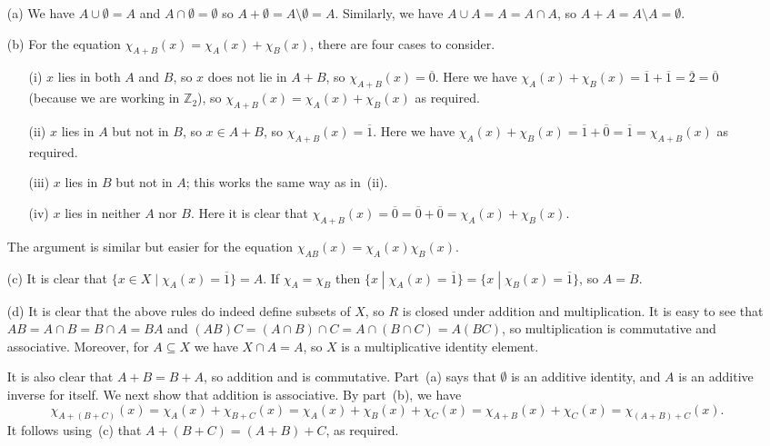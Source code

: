 \documentclass{amsart}
\newcommand{\Z}         {{\mathbb{Z}}}
\newcommand{\ov}[1]     {\overline{#1}}
\newcommand{\sm}        {\setminus}
\newcommand{\sse}       {\subseteq}
\newcommand{\st}        {\;|\;}
\renewcommand{\:}{\colon}
\theoremstyle{definition}
\renewenvironment{solution}{\SolutionAtEnd}{\endSolutionAtEnd}
\begin{document}
\begin{solution}
 \begin{itemize}
  \item[(a)] We have $A\cup\emptyset=A$ and $A\cap\emptyset=\emptyset$
   so $A+\emptyset=A\sm\emptyset=A$.  Similarly, we have
   $A\cup A=A=A\cap A$, so $A+A=A\sm A=\emptyset$.
  \item[(b)] For the equation $\chi_{A+B}(x)=\chi_A(x)+\chi_B(x)$,
   there are four cases to consider.
   \begin{itemize}
   \item[(i)] $x$ lies in both $A$ and $B$, so $x$ does not lie in
    $A+B$, so $\chi_{A+B}(x)=\ov{0}$.  Here we have
    $\chi_A(x)+\chi_B(x)=\ov{1}+\ov{1}=\ov{2}=\ov{0}$ (because we are
    working in $\Z_2$), so $\chi_{A+B}(x)=\chi_A(x)+\chi_B(x)$ as
    required.
   \item[(ii)] $x$ lies in $A$ but not in $B$, so $x\in A+B$, so
    $\chi_{A+B}(x)=\ov{1}$.    Here we have
    $\chi_A(x)+\chi_B(x)=\ov{1}+\ov{0}=\ov{1}=\chi_{A+B}(x)$ as
    required. 
   \item[(iii)] $x$ lies in $B$ but not in $A$; this works the same
    way as in~(ii).
   \item[(iv)] $x$ lies in neither $A$ nor $B$.  Here it is clear that
    $\chi_{A+B}(x)=\ov{0}=\ov{0}+\ov{0}=\chi_A(x)+\chi_B(x)$.
   \end{itemize}
   The argument is similar but easier for the equation
   $\chi_{AB}(x)=\chi_A(x)\chi_B(x)$.  
  \item[(c)] It is clear that $\{x\in X\st \chi_A(x)=\ov{1}\}=A$.  If
   $\chi_A=\chi_B$ then
   $\{x\st\chi_A(x)=\ov{1}\}=\{x\st\chi_B(x)=\ov{1}\}$, so $A=B$.
  \item[(d)]
   It is clear that the above rules do indeed define subsets of $X$, so
   $R$ is closed under addition and multiplication.  It is easy to see
   that $AB=A\cap B=B\cap A=BA$ and
   $(AB)C=(A\cap B)\cap C=A\cap(B\cap C)=A(BC)$, so multiplication is
   commutative and associative.  Moreover, for $A\sse X$ we have
   $X\cap A=A$, so $X$ is a multiplicative identity element.

   It is also clear that $A+B=B+A$, so addition and is commutative.
   Part~(a) says that $\emptyset$ is an additive identity, and $A$ is
   an additive inverse for itself.  We next show that addition is
   associative.  By part~(b), we have
   \[ \chi_{A+(B+C)}(x) = \chi_A(x)+\chi_{B+C}(x)
       = \chi_A(x) + \chi_B(x) + \chi_C(x) =
       \chi_{A+B}(x) + \chi_C(x) = \chi_{(A+B)+C}(x).
   \]
   It follows using~(c) that $A+(B+C)=(A+B)+C$, as required.  


\end{itemize}
\end{solution}
\end{document}
